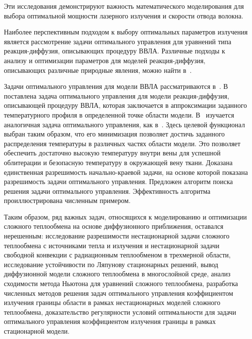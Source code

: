 Эти исследования демонстрируют важность математического моделирования
для выбора оптимальной мощности лазерного излучения и скорости отвода волокна.

Наиболее перспективным подходом к выбору оптимальных параметров
излучения является рассмотрение задачи оптимального управления
для уравнений типа реакция-диффузия, описывающих процедуру ВВЛА\@.
Различные подходы к анализу и оптимизации параметров для моделей реакция-диффузия,
описывающих различные природные явления, можно найти в~\cite{
Stability_Alekseev2016, Optimization_Brizitskii2018,
chebotarev2018inverse, Theoretical_Maslovskaya2021,
}.

Задачи оптимального управления для модели ВВЛА рассматриваются в~\cite{
    Optimal_Kovtanyuk2020, Inverse_Kovtanyuk2021}.
В~\cite{Optimal_Kovtanyuk2020} поставлена задача оптимального управления для модели реакция-диффузия,
описывающей процедуру ВВЛА, которая заключается в аппроксимации заданного
температурного профиля в определенной точке области модели.
В~\cite{Inverse_Kovtanyuk2021} изучается аналогичная задача оптимального управления,
как в~\cite{Optimal_Kovtanyuk2020}.
Здесь целевой функционал выбран таким образом, что его минимизация позволяет
достичь заданного распределения температуры в различных частях области модели.
Это позволяет обеспечить достаточно высокую температуру внутри
вены для успешной облитерации и безопасную температуру в окружающей вену ткани.
Доказана единственная разрешимость начально-краевой задачи,
на основе которой показана разрешимость задачи оптимального управления.
Предложен алгоритм поиска решения задачи оптимального управления.
Эффективность алгоритма проиллюстрирована численным примером.



Таким образом, ряд важных задач, относящихся к моделированию и
оптимизации сложного теплообмена на основе
диффузионного приближения, оставался нерешенным: исследование
разрешимости нестационарной задачи сложного
теплообмена с источниками тепла и излучения и нестационарной задачи
свободной конвекции с радиационным теплообменом в трехмерной
области, исследование устойчивости по Ляпунову стационарных решений,
вывод диффузионной модели сложного теплообмена в многослойной среде,
анализ сходимости метода Ньютона
для уравнений сложного теплообмена, разработка численных
методов решения задач оптимального управления
коэффициентом излучения границы области в рамках нестационарных моделей
сложного теплообмена, доказательство регулярности
условий оптимальности для задачи оптимального управления коэффициентом
излучения границы в рамках стационарной модели.

